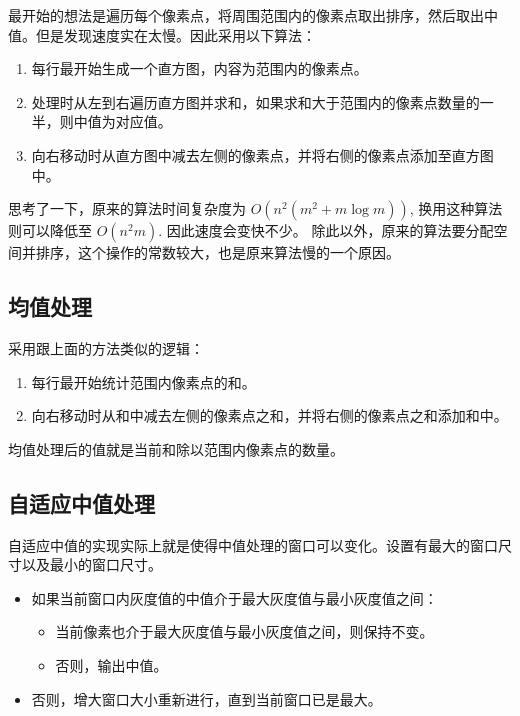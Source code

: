 \documentclass{article}
\begin{document}
最开始的想法是遍历每个像素点，将周围范围内的像素点取出排序，然后取出中值。但是发现速度实在太慢。因此采用以下算法：

\begin{enumerate}
    \item 每行最开始生成一个直方图，内容为范围内的像素点。
    \item 处理时从左到右遍历直方图并求和，如果求和大于范围内的像素点数量的一半，则中值为对应值。
    \item 向右移动时从直方图中减去左侧的像素点，并将右侧的像素点添加至直方图中。
\end{enumerate}

思考了一下，原来的算法时间复杂度为 $O(n^2(m^2+m\log m))$, 换用这种算法则可以降低至 $O(n^2m)$. 因此速度会变快不少。
除此以外，原来的算法要分配空间并排序，这个操作的常数较大，也是原来算法慢的一个原因。

\subsection{均值处理}

采用跟上面的方法类似的逻辑：

\begin{enumerate}
    \item 每行最开始统计范围内像素点的和。
    \item 向右移动时从和中减去左侧的像素点之和，并将右侧的像素点之和添加和中。
\end{enumerate}

均值处理后的值就是当前和除以范围内像素点的数量。

\subsection{自适应中值处理}

自适应中值的实现实际上就是使得中值处理的窗口可以变化。设置有最大的窗口尺寸以及最小的窗口尺寸。

\begin{itemize}
    \item 如果当前窗口内灰度值的中值介于最大灰度值与最小灰度值之间：
    \begin{itemize}
        \item 当前像素也介于最大灰度值与最小灰度值之间，则保持不变。
        \item 否则，输出中值。
    \end{itemize}
    \item 否则，增大窗口大小重新进行，直到当前窗口已是最大。
\end{itemize}
\end{document}
